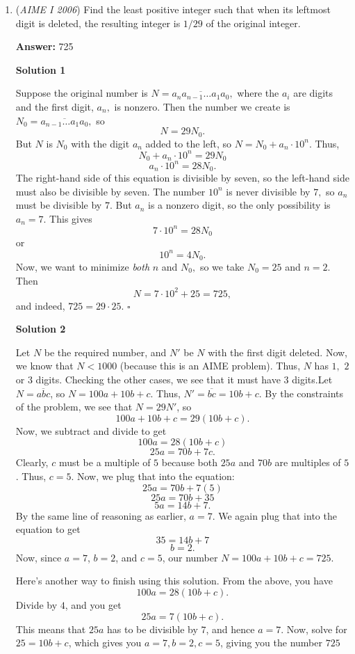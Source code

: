 \begin{enumerate}
 


	\item (\textit{AIME I 2006}) Find the least positive integer such that when its leftmost digit is deleted, the resulting integer is $1/29$ of the original integer.


 
 \textbf{Answer: }725



\textbf{Solution 1}

Suppose the original number is $N = \overline{a_na_{n-1}\ldots a_1a_0},$ where the $a_i$ are digits and the first digit, $a_n,$ is nonzero. Then the number we create is $N_0 = \overline{a_{n-1}\ldots a_1a_0},$ so 
 \[N = 29N_0.\] But $N$ is $N_0$ with the digit $a_n$ added to the left, so $N = N_0 + a_n \cdot 10^n.$ Thus, 
 \[N_0 + a_n\cdot 10^n = 29N_0\] 
 \[a_n \cdot 10^n = 28N_0.\] The right-hand side of this equation is divisible by seven, so the left-hand side must also be divisible by seven. The number $10^n$ is never divisible by $7,$ so $a_n$ must be divisible by $7.$ But $a_n$ is a nonzero digit, so the only possibility is $a_n = 7.$ This gives 
 \[7 \cdot 10^n = 28N_0\] or 
 \[10^n = 4N_0.\] Now, we want to minimize \textit{both} $n$ and $N_0,$ so we take $N_0 = 25$ and $n = 2.$ Then 
 \[N = 7 \cdot 10^2 + 25 = \boxed{725},\] and indeed, $725 = 29 \cdot 25.$ $\square$




\textbf{Solution 2}

Let $N$ be the required number, and $N'$ be $N$ with the first digit deleted. Now, we know that $N<1000$ (because this is an AIME problem). Thus, $N$ has $1,$ $2$ or $3$ digits. Checking the other cases, we see that it must have $3$ digits.Let $N=\overline{abc}$, so $N=100a+10b+c$. Thus, $N'=\overline{bc}=10b+c$. By the constraints of the problem, we see that $N=29N'$, so 
 \[100a+10b+c=29(10b+c).\] Now, we subtract and divide to get 
 \[100a=28(10b+c)\] 
 \[25a=70b+7c.\] Clearly, $c$ must be a multiple of $5$ because both $25a$ and $70b$ are multiples of $5$. Thus, $c=5$. Now, we plug that into the equation: 
 \[25a=70b+7(5)\] 
 \[25a=70b+35\] 
 \[5a=14b+7.\] By the same line of reasoning as earlier, $a=7$. We again plug that into the equation to get 
 \[35=14b+7\] 
 \[b=2.\] Now, since $a=7$, $b=2$, and $c=5$, our number $N=100a+10b+c=\boxed{725}$.

 Here's another way to finish using this solution. From the above, you have 
 \[100a = 28(10b + c).\] Divide by $4$, and you get 
 \[25a = 7(10b + c).\] This means that $25a$ has to be divisible by $7$, and hence $a = 7.$ Now, solve for $25 = 10b + c$, which gives you $a = 7, b = 2, c = 5$, giving you the number $\boxed{725}$





\end{enumerate}

